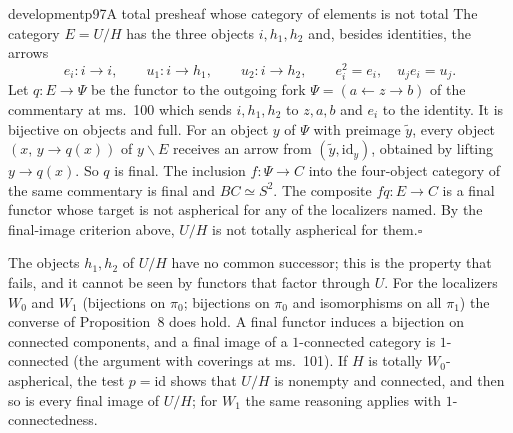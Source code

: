 \begin{dcomment}{development}{p97}{A total presheaf whose category of elements is not total}
The category $E=U/H$ has the three objects $i,h_1,h_2$ and, besides identities, the arrows
\[
 e_i:i\to i,\qquad u_1:i\to h_1,\qquad u_2:i\to h_2,
 \qquad e_i^2=e_i,\quad u_je_i=u_j.
\]
Let $q:E\to\Psi$ be the functor to the outgoing fork $\Psi=(a\leftarrow z\to b)$ of the commentary at ms.~100 which sends $i,h_1,h_2$ to $z,a,b$ and $e_i$ to the identity. It is bijective on objects and full. For an object $y$ of $\Psi$ with preimage $\tilde y$, every object $(x,\,y\to q(x))$ of $y\backslash E$ receives an arrow from $(\tilde y,\mathrm{id}_y)$, obtained by lifting $y\to q(x)$. So $q$ is final. The inclusion $f:\Psi\to C$ into the four-object category of the same commentary is final and $BC\simeq S^2$. The composite $fq:E\to C$ is a final functor whose target is not aspherical for any of the localizers named. By the final-image criterion above, $U/H$ is not totally aspherical for them.\hfill$\square$

The objects $h_1,h_2$ of $U/H$ have no common successor; this is the property that fails, and it cannot be seen by functors that factor through $U$. For the localizers $W_0$ and $W_1$ (bijections on $\pi_0$; bijections on $\pi_0$ and isomorphisms on all $\pi_1$) the converse of Proposition~8 does hold. A final functor induces a bijection on connected components, and a final image of a $1$-connected category is $1$-connected (the argument with coverings at ms.~101). If $H$ is totally $W_0$-aspherical, the test $p=\mathrm{id}$ shows that $U/H$ is nonempty and connected, and then so is every final image of $U/H$; for $W_1$ the same reasoning applies with $1$-connectedness.
\end{dcomment}

